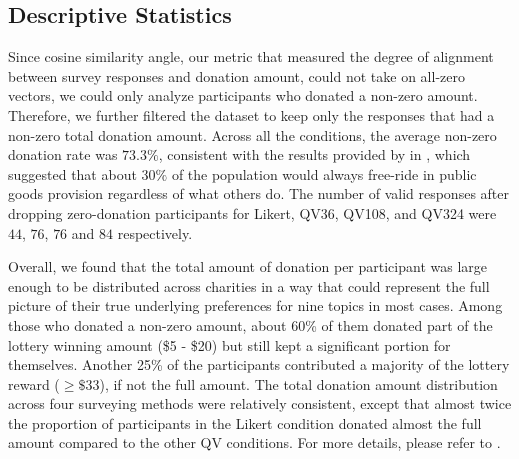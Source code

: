 \subsection{Descriptive Statistics}


Since cosine similarity angle, our metric that measured the degree of alignment between survey responses and donation amount, could not take on all-zero vectors, we could only analyze participants who donated a non-zero amount. Therefore, we further filtered the dataset to keep only the responses that had a non-zero total donation amount. Across all the conditions, the average non-zero donation rate was $73.3\%$, consistent with the results provided by \textcite{fehr2007human} in \citeyear{fehr2007human}, which suggested that about $30\%$ of the population would always free-ride in public goods provision regardless of what others do. The number of valid responses after dropping zero-donation participants for Likert, QV36, QV108, and QV324 were $44$, $76$, $76$ and $84$ respectively.

Overall, we found that the total amount of donation per participant was large enough to be distributed across charities in a way that could represent the full picture of their true underlying preferences for nine topics in most cases. Among those who donated a non-zero amount, about 60\% of them donated part of the lottery winning amount (\$5 - \$20) but still kept a significant portion for themselves. Another 25\% of the participants contributed a majority of the lottery reward ($\geq \$33$), if not the full amount. The total donation amount distribution across four surveying methods were relatively consistent, except that almost twice the proportion of participants in the Likert condition donated almost the full amount compared to the other QV conditions. For more details, please refer to .




